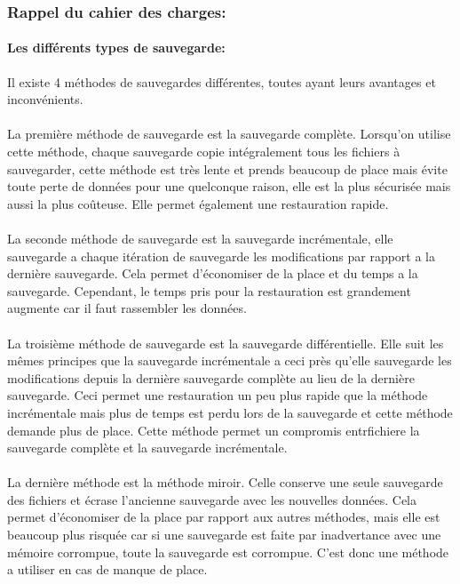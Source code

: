         \subsubsection{Rappel du cahier des charges:}
            \paragraph*{Les différents types de sauvegarde:\\}
            Il existe 4 méthodes de sauvegardes différentes, toutes ayant leurs avantages et inconvénients.
            \paragraph*{}
            La première méthode de sauvegarde est la sauvegarde complète. Lorsqu'on utilise cette méthode, chaque sauvegarde copie intégralement tous les fichiers à sauvegarder, cette méthode est très lente et prends beaucoup de place mais évite toute perte de données pour une quelconque raison, elle est la plus sécurisée mais aussi la plus coûteuse. Elle permet également une restauration rapide.
            \paragraph*{}
            La seconde méthode de sauvegarde est la sauvegarde incrémentale, elle sauvegarde a chaque itération de sauvegarde les modifications par rapport a la dernière sauvegarde. Cela permet d'économiser de la place et du temps a la sauvegarde. Cependant, le temps pris pour la restauration est grandement augmente car il faut rassembler les données.
            \paragraph*{}
            La troisième méthode de sauvegarde est la sauvegarde différentielle. Elle suit les mêmes principes que la sauvegarde incrémentale a ceci près qu'elle sauvegarde les modifications depuis la dernière sauvegarde complète au lieu de la dernière sauvegarde. Ceci permet une restauration un peu plus rapide que la méthode incrémentale mais plus de temps est perdu lors de la sauvegarde et cette méthode demande plus de place. Cette méthode permet un compromis entrfichiere la sauvegarde complète et la sauvegarde incrémentale.
            \paragraph*{}
            La dernière méthode est la méthode miroir. Celle conserve une seule sauvegarde des fichiers et écrase l'ancienne sauvegarde avec les nouvelles données. Cela permet d'économiser de la place par rapport aux autres méthodes, mais elle est beaucoup plus risquée car si une sauvegarde est faite par inadvertance avec une mémoire corrompue, toute la sauvegarde est corrompue. C'est donc une méthode a utiliser en cas de manque de place. 
